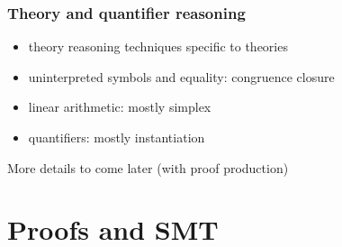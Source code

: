 \documentclass[svgnames,table,mathserif]{beamer}
\begin{document}

\begin{frame}
  \frametitle{Theory and quantifier reasoning}

  \begin{itemize}
  \item theory reasoning techniques specific to theories
  \item uninterpreted symbols and equality: congruence closure
  \item linear arithmetic: mostly simplex
  \item quantifiers: mostly instantiation
  \end{itemize}

  More details to come later (with proof production)

\end{frame}


\section{Proofs and SMT}

\end{document}

